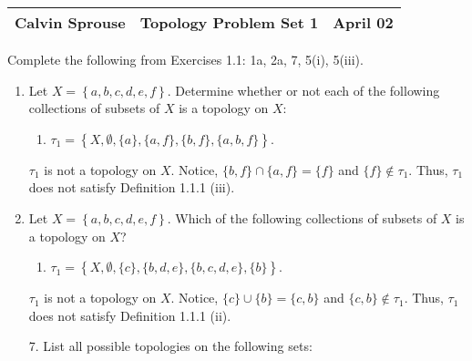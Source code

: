 \documentclass[a4paper, 12pt]{config/homework}
\begin{document}
\noindent
\begin{tabularx}{\textwidth}{>{\centering\arraybackslash}X>{\centering\arraybackslash}X>{\centering\arraybackslash}X}
Calvin Sprouse & Topology Problem Set 1 & 2024 April 02\\
\midrule
\end{tabularx}

\vspace{\baselineskip}
Complete the following from Exercises 1.1: 1a, 2a, 7, 5(i), 5(iii).
\begin{enumerate}
\item Let \(X=\left\{a,b,c,d,e,f\right\}\). Determine whether or not each of the following collections of subsets of \(X\) is a topology on \(X\):
\begin{enumerate}[label=(\alph*)]
\item \(\tau_1 = \left\{X,\emptyset,\{a\},\{a,f\},\{b,f\},\{a,b,f\}\right\}\).
\end{enumerate}

\(\tau_1\) is not a topology on \(X\). Notice, \(\{b,f\}\cap\{a,f\}=\{f\}\) and \(\{f\}\notin\tau_1\). Thus, \(\tau_1\) does not satisfy Definition 1.1.1 (iii).

\vspace{\baselineskip}
\item Let \(X=\left\{a,b,c,d,e,f\right\}\). Which of the following collections of subsets of \(X\) is a topology on \(X\)?
\begin{enumerate}[label=(\alph*)]
\item \(\tau_1 = \left\{X,\emptyset,\{c\},\{b,d,e\},\{b,c,d,e\},\{b\}\right\}\).
\end{enumerate}

\(\tau_1\) is not a topology on \(X\). Notice, \(\{c\}\cup\{b\}=\{c,b\}\) and \(\{c,b\}\notin\tau_1\). Thus, \(\tau_1\) does not satisfy Definition 1.1.1 (ii).

\pagebreak
{}
\item[7.] List all possible topologies on the following sets:


\end{enumerate}
\end{document}
